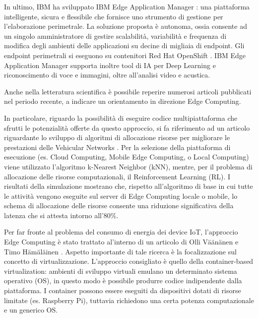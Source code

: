 In ultimo, IBM ha sviluppato IBM Edge Application Manager \cite{IBM}: una piattaforma intelligente, sicura e flessibile che fornisce uno strumento di gestione per l'elaborazione perimetrale. La soluzione proposta è autonoma, ossia consente ad un singolo amministratore di gestire scalabilità, variabilità e frequenza di modifica degli ambienti delle applicazioni su decine di migliaia di endpoint. Gli endpoint perimetrali si eseguono su contenitori Red Hat OpenShift \cite{redhat}. IBM Edge Application Manager supporta inoltre tool di IA per Deep Learning e riconoscimento di voce e immagini, oltre all'analisi video e acustica.

Anche nella letteratura scientifica è possibile reperire numerosi articoli pubblicati nel periodo recente, a indicare un orientamento in direzione Edge Computing.

In particolare, riguardo la possibilità di eseguire codice multipiattaforma che sfrutti le potenzialità offerte da questo approccio, si fa riferimento ad un articolo riguardante lo sviluppo di algoritmi di allocazione risorse per migliorare le prestazioni delle Vehicular Networks \cite{VN}. Per la selezione della piattaforma di esecuzione (es. Cloud Computing, Mobile Edge Computing, o Local Computing) viene utilizzato l'algoritmo k-Nearest Neighbor (kNN), mentre, per il problema di allocazione delle risorse computazionali, il Reinforcement Learning (RL). I risultati della simulazione mostrano che, rispetto all'algoritmo di base in cui tutte le attività vengono eseguite sul server di Edge Computing locale o mobile, lo schema di allocazione delle risorse consente una riduzione significativa della latenza che si attesta intorno all'80\%.

Per far fronte al problema del consumo di energia dei device IoT, l'approccio Edge Computing è stato trattato al'interno di un articolo di Olli Väänänen e Timo Hämäläinen \cite{energyIoT}. Aspetto importante di tale ricerca è la focalizzazione sul concetto di virtualizzazione. L'approccio consigliato è quello della container-based virtualization: ambienti di sviluppo virtuali emulano un determinato sistema operativo (OS), in questo modo è possibile produrre codice indipendente dalla piattaforma. I container possono essere eseguiti da dispositivi dotati di risorse limitate (es. Raspberry Pi), tuttavia richiedono una certa potenza computazionale e un generico OS.

